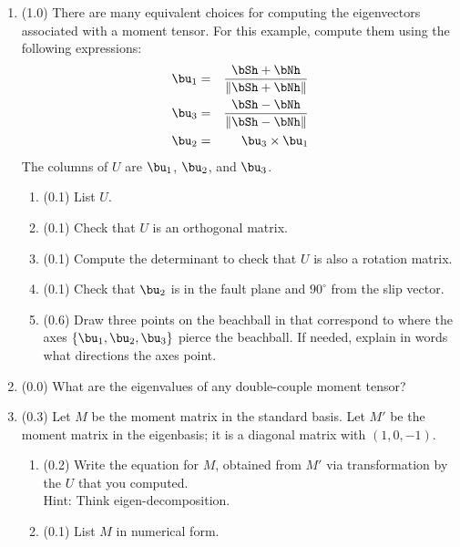 \documentclass[11pt,titlepage,fleqn]{article}
\newcommand{\Umat}{U}
\newcommand{\Mmat}{M}
\begin{document}
\begin{enumerate}

\item (1.0) There are many equivalent choices for computing the eigenvectors associated with a moment tensor. For this example, compute them using the following expressions:
%
\begin{eqnarray*}
\bu_1 &=& \frac{\bSh + \bNh}{\| \bSh + \bNh \|}
\\
\bu_3 &=& \frac{\bSh - \bNh}{\| \bSh - \bNh \|}
\\
\bu_2 &=& \bu_3  \times \bu_1
\end{eqnarray*}
%
The columns of $\Umat$ are $\bu_1$, $\bu_2$, and $\bu_3$.
%
\begin{enumerate}
\item (0.1) List $\Umat$.
\item (0.1) Check that $\Umat$ is an orthogonal matrix.
\item (0.1) Compute the determinant to check that $\Umat$ is also a rotation matrix.
\item (0.1) Check that $\bu_2$ is in the fault plane and $90^\circ$ from the slip vector.
\item (0.6) Draw three points on the beachball in  that correspond to where the axes $\{\bu_1,\bu_2,\bu_3\}$ pierce the beachball. If needed, explain in words what directions the axes point.
\end{enumerate}


\item (0.0) What are the eigenvalues of any double-couple moment tensor?


\item (0.3) Let $M$ be the moment matrix in the standard basis.
Let $M'$ be the moment matrix in the eigenbasis; it is a diagonal matrix with $(1, 0, -1)$.
%
\begin{enumerate}
\item (0.2) Write the equation for $\Mmat$, obtained from $\Mmat'$ via transformation by the $\Umat$ that you computed. \\
Hint: Think eigen-decomposition.
\item (0.1) List $\Mmat$ in numerical form.
\end{enumerate}

\end{enumerate}
\end{document}
